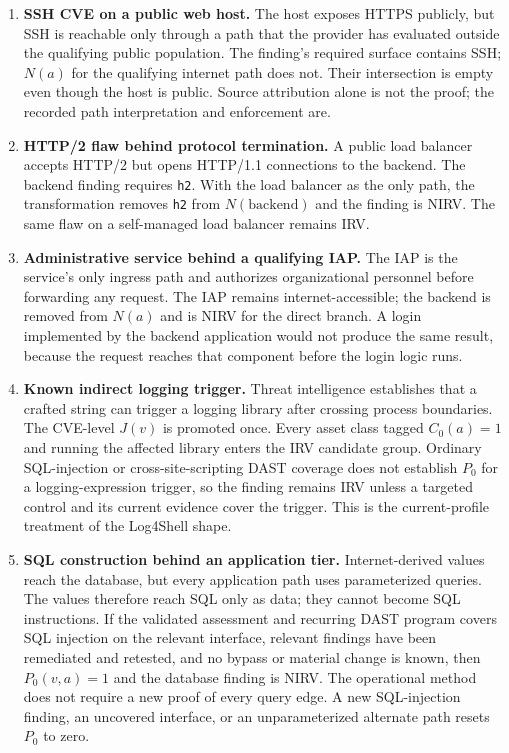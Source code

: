 \documentclass[11pt]{article}
\newcommand{\code}[1]{\texttt{#1}}
\begin{document}
\begin{enumerate}[leftmargin=1.8em]
\item \textbf{SSH CVE on a public web host.}
The host exposes HTTPS publicly, but SSH is reachable only through a path that
the provider has evaluated outside the qualifying public population. The
finding's required surface contains SSH; $N(a)$ for the qualifying internet
path does not. Their intersection is empty even though the host is public.
Source attribution alone is not the proof; the recorded path interpretation
and enforcement are.

\item \textbf{HTTP/2 flaw behind protocol termination.}
A public load balancer accepts HTTP/2 but opens HTTP/1.1 connections to the
backend. The backend finding requires \code{h2}. With the load balancer as the
only path, the transformation removes \code{h2} from $N(\mathrm{backend})$ and
the finding is NIRV. The same flaw on a self-managed load balancer remains IRV.

\item \textbf{Administrative service behind a qualifying IAP.}
The IAP is the service's only ingress path and authorizes organizational
personnel before forwarding any request. The IAP remains internet-accessible;
the backend is removed from $N(a)$ and is NIRV for the direct branch. A login
implemented by the backend application would not produce the same result,
because the request reaches that component before the login logic runs.

\item \textbf{Known indirect logging trigger.}
Threat intelligence establishes that a crafted string can trigger a logging
library after crossing process boundaries. The CVE-level $J(v)$ is promoted
once. Every asset class tagged $C_0(a)=1$ and running the affected library
enters the IRV candidate group. Ordinary SQL-injection or cross-site-scripting
DAST coverage does not establish $P_0$ for a logging-expression trigger, so the
finding remains IRV unless a targeted control and its current evidence cover
the trigger. This is the current-profile treatment of the Log4Shell shape.

\item \textbf{SQL construction behind an application tier.}
Internet-derived values reach the database, but every application path uses
parameterized queries. The values therefore reach SQL only as data; they cannot
become SQL instructions. If the validated assessment and recurring DAST program
covers SQL injection on the relevant interface, relevant findings have been
remediated and retested, and no bypass or material change is known, then
$P_0(v,a)=1$ and the database finding is NIRV. The operational method does not
require a new proof of every query edge. A new SQL-injection finding, an
uncovered interface, or an unparameterized alternate path resets $P_0$ to zero.


\end{enumerate}
\end{document}
